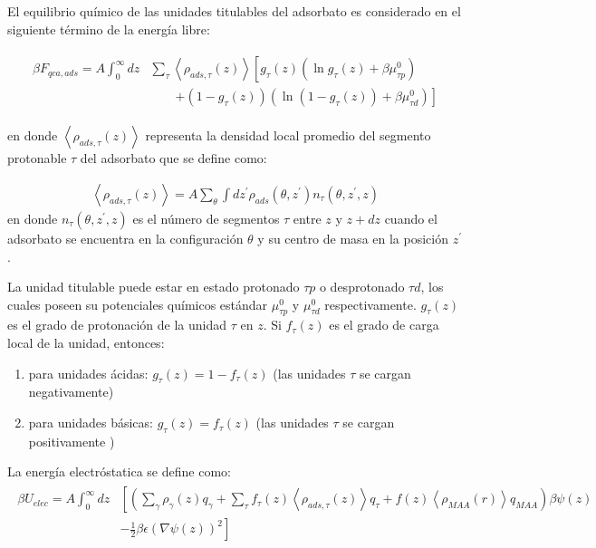 El equilibrio qu\'imico de las unidades titulables del adsorbato  es considerado en el siguiente t\'ermino de la energ\'ia libre:

\begin{align}
	\begin{aligned}
		\beta F_{qca,ads} = A\int_0^\infty dz& \sum_\tau \left<\rho_{ads,\tau}(z)\right> \left[g_\tau(z)(\ln g_\tau(z)+ \beta\mu^0_{\tau p})\right.\\
		&\qquad\left.+(1-g_\tau(z))(\ln (1-g_\tau(z))+\beta\mu^0_{\tau d})\right]   
	\end{aligned}
\end{align} 

\noindent en donde $\left<\rho_{ads,\tau}(z)\right>$ representa la densidad local promedio del segmento protonable $\tau$ del adsorbato que se define como:

\begin{align}
	\left<\rho_{ads,\tau}(z)\right> = A\sum_\theta \int dz^\prime  \rho_{ads}(\theta,z^\prime)n_\tau(\theta,z^\prime, z)
	\label{eq:film:segments_pro_si}
\end{align}
\noindent en donde $n_\tau(\theta,z^\prime, z)$ es el n\'umero de segmentos $\tau$ entre  $z$ y $z+ dz$ cuando el adsorbato se encuentra en la configuraci\'on $\theta$ y su centro de masa en la posici\'on $z^\prime$.

La unidad titulable puede estar en estado protonado $\tau p$ o desprotonado $\tau d$, los cuales poseen su potenciales qu\'imicos est\'andar $\mu^0_{\tau p}$ y $\mu^0_{\tau d}$ respectivamente. 
$g_\tau (z)$ es el grado de protonaci\'on de la unidad $\tau$ en $z$. Si $f_\tau (z)$ es el grado de carga local de la unidad, entonces:


\begin{enumerate}
	\item para unidades \'acidas: $g_\tau(z) = 1-f_\tau(z)$ (las unidades $\tau$ se cargan negativamente)
	\item para unidades b\'asicas: $g_\tau(z) = f_\tau(z)$ (las  unidades $\tau$ se cargan positivamente  )
\end{enumerate}


La energ\'ia electr\'ostatica se define como:
\begin{align}
	\begin{aligned}
		\beta U_{elec}= A\int_0^\infty dz&\left[\left(\sum_{\gamma } {\rho_\gamma(z) q_\gamma + \sum_\tau{f_\tau(z) \left<\rho_{ads,\tau}(z)\right> q_\tau} +  f(z)\left<\rho_{MAA}(r)\right>q_{MAA}}\right)\beta\psi(z) \right. \\ &\left.-\frac{1}{2}\beta\epsilon(\nabla\psi(z))^2 \right]
	\end{aligned}
\end{align} 

